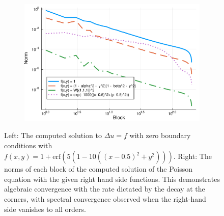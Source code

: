 \documentclass[11pt, oneside]{article}   	%
\begin{document}
\begin{figure}[t]
\begin{subfigure}{0.3\textwidth}
	\end{subfigure}
	\begin{subfigure}{0.5\textwidth}
	\centering
	\includegraphics[scale=0.5]{solutionblocknorms-poisson-diskslice-alpha=0p2-beta=0p8-N=200}
	\end{subfigure}
	\caption{Left: The computed solution to $\Delta u = f$ with zero boundary conditions with $f(x,y) = 1 + \text{erf}(5(1 - 10((x - 0.5)^2 + y^2)))$. Right: The norms of each block of the computed solution of the Poisson equation with the given right hand side functions. This demonstrates algebraic convergence with the rate dictated by the decay at the corners, with spectral convergence observed when the right-hand side vanishes to all orders.}
	\centering
	\label{fig:poisson}
\end{figure}
\end{document}
